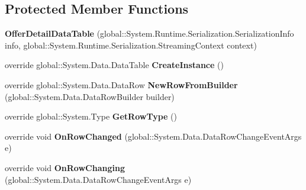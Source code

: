 \subsection*{Protected Member Functions}
\begin{DoxyCompactItemize}
\item 
{\bfseries Offer\+Detail\+Data\+Table} (global\+::\+System.\+Runtime.\+Serialization.\+Serialization\+Info info, global\+::\+System.\+Runtime.\+Serialization.\+Streaming\+Context context)\hypertarget{class_products_1_1_data_1_1ds_sage_1_1_offer_detail_data_table_a3953932c5010bff3ba3b5de873aa5a73}{}\label{class_products_1_1_data_1_1ds_sage_1_1_offer_detail_data_table_a3953932c5010bff3ba3b5de873aa5a73}

\item 
override global\+::\+System.\+Data.\+Data\+Table {\bfseries Create\+Instance} ()\hypertarget{class_products_1_1_data_1_1ds_sage_1_1_offer_detail_data_table_a1257cb879dc582f98a1dfe6c68164cee}{}\label{class_products_1_1_data_1_1ds_sage_1_1_offer_detail_data_table_a1257cb879dc582f98a1dfe6c68164cee}

\item 
override global\+::\+System.\+Data.\+Data\+Row {\bfseries New\+Row\+From\+Builder} (global\+::\+System.\+Data.\+Data\+Row\+Builder builder)\hypertarget{class_products_1_1_data_1_1ds_sage_1_1_offer_detail_data_table_afb8be3f0c03034d6e41fe1b523c0b3e8}{}\label{class_products_1_1_data_1_1ds_sage_1_1_offer_detail_data_table_afb8be3f0c03034d6e41fe1b523c0b3e8}

\item 
override global\+::\+System.\+Type {\bfseries Get\+Row\+Type} ()\hypertarget{class_products_1_1_data_1_1ds_sage_1_1_offer_detail_data_table_a6aa020e0520e397d210fd9baa713191e}{}\label{class_products_1_1_data_1_1ds_sage_1_1_offer_detail_data_table_a6aa020e0520e397d210fd9baa713191e}

\item 
override void {\bfseries On\+Row\+Changed} (global\+::\+System.\+Data.\+Data\+Row\+Change\+Event\+Args e)\hypertarget{class_products_1_1_data_1_1ds_sage_1_1_offer_detail_data_table_a7be922c5fb346823bc0750aa977a9d8a}{}\label{class_products_1_1_data_1_1ds_sage_1_1_offer_detail_data_table_a7be922c5fb346823bc0750aa977a9d8a}

\item 
override void {\bfseries On\+Row\+Changing} (global\+::\+System.\+Data.\+Data\+Row\+Change\+Event\+Args e)\hypertarget{class_products_1_1_data_1_1ds_sage_1_1_offer_detail_data_table_a9b6a75cbaa804298de2c3485b8389555}{}\label{class_products_1_1_data_1_1ds_sage_1_1_offer_detail_data_table_a9b6a75cbaa804298de2c3485b8389555}


\end{DoxyCompactItemize}
